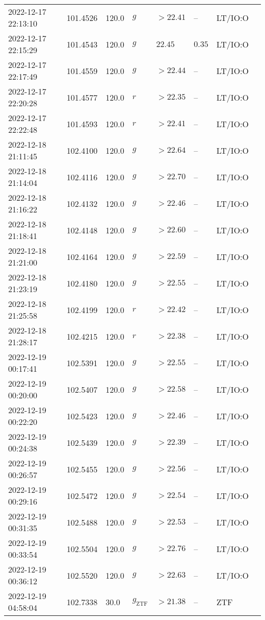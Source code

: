 \documentclass{nature_plusfigure}
\begin{document}
\begin{supplement}
\begin{center}
\begin{longtable}{llllllll}
2022-12-17 22:13:10 & 101.4526 & 120.0 & $g$ & $>22.41$ & -- & LT/IO:O &  \\ 
2022-12-17 22:15:29 & 101.4543 & 120.0 & $g$ & $22.45$ & $0.35$ & LT/IO:O &  \\ 
2022-12-17 22:17:49 & 101.4559 & 120.0 & $g$ & $>22.44$ & -- & LT/IO:O &  \\ 
2022-12-17 22:20:28 & 101.4577 & 120.0 & $r$ & $>22.35$ & -- & LT/IO:O &  \\ 
2022-12-17 22:22:48 & 101.4593 & 120.0 & $r$ & $>22.41$ & -- & LT/IO:O &  \\ 
2022-12-18 21:11:45 & 102.4100 & 120.0 & $g$ & $>22.64$ & -- & LT/IO:O &  \\ 
2022-12-18 21:14:04 & 102.4116 & 120.0 & $g$ & $>22.70$ & -- & LT/IO:O &  \\ 
2022-12-18 21:16:22 & 102.4132 & 120.0 & $g$ & $>22.46$ & -- & LT/IO:O &  \\ 
2022-12-18 21:18:41 & 102.4148 & 120.0 & $g$ & $>22.60$ & -- & LT/IO:O &  \\ 
2022-12-18 21:21:00 & 102.4164 & 120.0 & $g$ & $>22.59$ & -- & LT/IO:O &  \\ 
2022-12-18 21:23:19 & 102.4180 & 120.0 & $g$ & $>22.55$ & -- & LT/IO:O &  \\ 
2022-12-18 21:25:58 & 102.4199 & 120.0 & $r$ & $>22.42$ & -- & LT/IO:O &  \\ 
2022-12-18 21:28:17 & 102.4215 & 120.0 & $r$ & $>22.38$ & -- & LT/IO:O &  \\ 
2022-12-19 00:17:41 & 102.5391 & 120.0 & $g$ & $>22.55$ & -- & LT/IO:O &  \\ 
2022-12-19 00:20:00 & 102.5407 & 120.0 & $g$ & $>22.58$ & -- & LT/IO:O &  \\ 
2022-12-19 00:22:20 & 102.5423 & 120.0 & $g$ & $>22.46$ & -- & LT/IO:O &  \\ 
2022-12-19 00:24:38 & 102.5439 & 120.0 & $g$ & $>22.39$ & -- & LT/IO:O &  \\ 
2022-12-19 00:26:57 & 102.5455 & 120.0 & $g$ & $>22.56$ & -- & LT/IO:O &  \\ 
2022-12-19 00:29:16 & 102.5472 & 120.0 & $g$ & $>22.54$ & -- & LT/IO:O &  \\ 
2022-12-19 00:31:35 & 102.5488 & 120.0 & $g$ & $>22.53$ & -- & LT/IO:O &  \\ 
2022-12-19 00:33:54 & 102.5504 & 120.0 & $g$ & $>22.76$ & -- & LT/IO:O &  \\ 
2022-12-19 00:36:12 & 102.5520 & 120.0 & $g$ & $>22.63$ & -- & LT/IO:O &  \\ 
2022-12-19 04:58:04 & 102.7338 & 30.0 & ${g}_\mathrm{ZTF}$ & $>21.38$ & -- & ZTF &  \\ 

\end{longtable}
\end{center}
\end{supplement}
\end{document}

